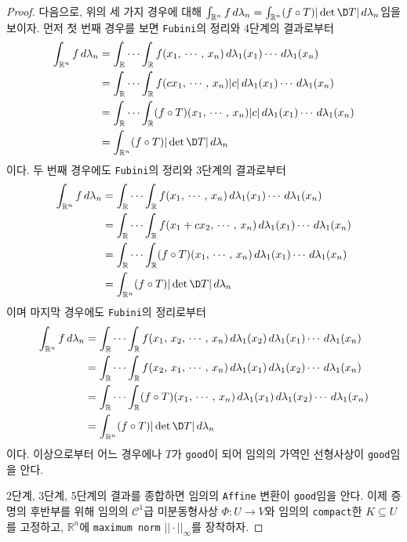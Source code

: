 \begin{proof}
    다음으로, 위의 세 가지 경우에 대해 $\int_{\mathbb{R}^n}f\,d\lambda_n=\int_{\mathbb{R}^n}(f\circ T)|\det\D T|\,d\lambda_n$임을 보이자. 먼저 첫 번째 경우를 보면 \texttt{Fubini}의 정리와 4단계의 결과로부터
    \begin{align*}
        \int_{\mathbb{R}^n}f\,d\lambda_n&=\int_\mathbb{R}\cdots\int_\mathbb{R}f(x_1,\,\cdots,\,x_n)\,d\lambda_1(x_1)\cdots\,d\lambda_1(x_n)\\
        &=\int_\mathbb{R}\cdots\int_\mathbb{R}f(cx_1,\,\cdots,\,x_n)|c|\,d\lambda_1(x_1)\cdots\,d\lambda_1(x_n)\\
        &=\int_\mathbb{R}\cdots\int_\mathbb{R}(f\circ T)(x_1,\,\cdots,\,x_n)|c|\,d\lambda_1(x_1)\cdots\,d\lambda_1(x_n)\\
        &=\int_{\mathbb{R}^n}(f\circ T)|\det\D T|\,d\lambda_n
    \end{align*}
    이다. 두 번째 경우에도 \texttt{Fubini}의 정리와 3단계의 결과로부터
    \begin{align*}
        \int_{\mathbb{R}^n}f\,d\lambda_n&=\int_\mathbb{R}\cdots\int_\mathbb{R}f(x_1,\,\cdots,\,x_n)\,d\lambda_1(x_1)\cdots\,d\lambda_1(x_n)\\
        &=\int_\mathbb{R}\cdots\int_\mathbb{R}f(x_1+cx_2,\,\cdots,\,x_n)\,d\lambda_1(x_1)\cdots\,d\lambda_1(x_n)\\
        &=\int_\mathbb{R}\cdots\int_\mathbb{R}(f\circ T)(x_1,\,\cdots,\,x_n)\,d\lambda_1(x_1)\cdots\,d\lambda_1(x_n)\\
        &=\int_{\mathbb{R}^n}(f\circ T)|\det\D T|\,d\lambda_n
    \end{align*}
    이며 마지막 경우에도 \texttt{Fubini}의 정리로부터
    \begin{align*}
        \int_{\mathbb{R}^n}f\,d\lambda_n&=\int_\mathbb{R}\cdots\int_\mathbb{R}f(x_1,\,x_2,\,\cdots,\,x_n)\,d\lambda_1(x_2)\,d\lambda_1(x_1)\cdots\,d\lambda_1(x_n)\\
        &=\int_\mathbb{R}\cdots\int_\mathbb{R}f(x_2,\,x_1,\,\cdots,\,x_n)\,d\lambda_1(x_1)\,d\lambda_1(x_2)\cdots\,d\lambda_1(x_n)\\
        &=\int_\mathbb{R}\cdots\int_\mathbb{R}(f\circ T)(x_1,\,\cdots,\,x_n)\,d\lambda_1(x_1)\,d\lambda_1(x_2)\cdots\,d\lambda_1(x_n)\\
        &=\int_{\mathbb{R}^n}(f\circ T)|\det\D T|\,d\lambda_n
    \end{align*}
    이다. 이상으로부터 어느 경우에나 $T$가 \texttt{good}이 되어 임의의 가역인 선형사상이 \texttt{good}임을 안다.

    2단계, 3단계, 5단계의 결과를 종합하면 임의의 \texttt{Affine} 변환이 \texttt{good}임을 안다. 이제 증명의 후반부를 위해 임의의 $\mathcal{C}^1$급 미분동형사상 $\Phi:U\to V$와 임의의 \texttt{compact}한 $K\subseteq U$를 고정하고, $\mathbb{R}^n$에 \texttt{maximum norm} $||\cdot||_\infty$를 장착하자.


\end{proof}
